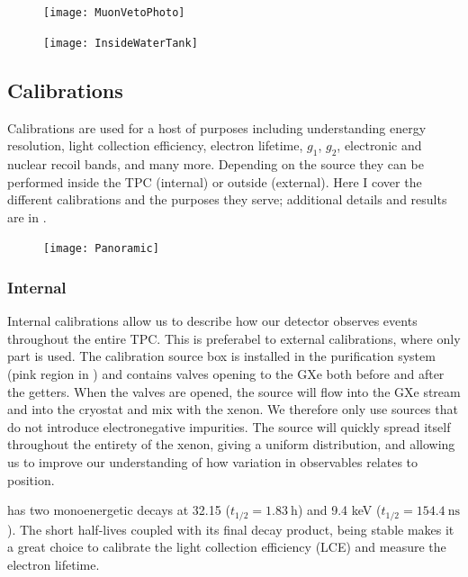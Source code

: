 \begin{figure}
\centering
\texttt{[image: MuonVetoPhoto]}
\label{fig:xenon1t_water_shield_photo}
\end{figure}

\begin{figure}
\centering
\texttt{[image: InsideWaterTank]}
\label{fig:xenon1t_water_shield_interior}
\end{figure}



\subsection{Calibrations}
\label{subsec:xenon1t_calibrations}
Calibrations are used for a host of purposes including understanding energy resolution, light collection efficiency, electron lifetime,
$g_1$, $g_2$, electronic and nuclear recoil bands, and many more.  Depending on the source they can be performed inside the TPC (internal) or
outside (external).  Here I cover the different calibrations and the purposes they serve; additional details and results are in
.

\begin{figure}
\centering
\texttt{[image: Panoramic]}
\label{fig:xenon1t_panoramic}
\end{figure}

\subsubsection{Internal}
\label{subsubsec:xenon1t_calibrations_internal}
Internal calibrations allow us to describe how our detector observes events throughout the entire TPC.  This is preferabel to external
calibrations, where only part is used.  The calibration source box is installed in the purification system (pink region in
) and contains valves opening to the GXe both before and after the getters.  When the valves are opened,
the source will flow into the GXe stream and into the cryostat and mix with the xenon.  We therefore only use sources that do not introduce
electronegative impurities.  The source will quickly spread itself throughout the entirety of the xenon, giving a uniform distribution,
and allowing us to improve our understanding of how variation in observables relates to position.

\kryptonmeta has two monoenergetic decays at 32.15 ($t_{1/2} = 1.83\ \mathrm{h}$) and 9.4 keV ($t_{1/2} = 154.4\ \mathrm{ns}$).  The short
half-lives coupled with its final decay product,  being stable makes it a great choice to calibrate the light collection
efficiency (LCE) and measure the electron lifetime.

